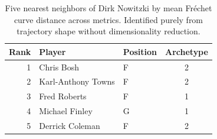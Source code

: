\begin{table}[htbp]
  \centering\small
  \begin{tabular}{rllc}
    \toprule
    Rank & Player & Position & Archetype \\
    \midrule
    1 & Chris Bosh & F & 2 \\
    2 & Karl-Anthony Towns & F & 2 \\
    3 & Fred Roberts & F & 1 \\
    4 & Michael Finley & G & 1 \\
    5 & Derrick Coleman & F & 2 \\
    \bottomrule
  \end{tabular}
  \caption{Five nearest neighbors of Dirk Nowitzki by mean Fr\'{e}chet curve distance across metrics. Identified purely from trajectory shape without dimensionality reduction.}
  \label{tab:Dirk_Nowitzki_frechet_curve_neighbors}
\end{table}

